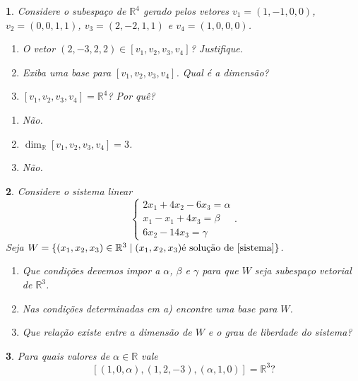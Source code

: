 \documentclass[12pt]{exam}
\newtheorem{exercicio}{}
\newcommand{\real}{\mathbb{R}}
\begin{document}
\begin{exercicio}
  Considere o subespa\c{c}o de $\real^4$ gerado pelos vetores $v_1 = (1, -1, 0, 0)$, $v_2 = (0, 0, 1, 1)$, $v_3 = (2, -2, 1, 1)$ e $v_4 = (1, 0, 0, 0)$.
  \begin{enumerate}[label={\alph*})]
    \item O vetor $(2, -3, 2, 2) \in [v_1, v_2, v_3, v_4]$? Justifique.
    \item Exiba uma base para $[v_1, v_2, v_3, v_4]$. Qual \'e a dimens\~ao?
    \item $[v_1, v_2, v_3, v_4] = \real^4$? Por qu\^e?
  \end{enumerate}
  \begin{solucao}
    \begin{enumerate}[label={\alph*})]
      \item N\~ao.
      \item $\dim_\real [v_1, v_2, v_3, v_4] = 3$.
      \item N\~ao.
    \end{enumerate}
  \end{solucao}
\end{exercicio}


\begin{exercicio}
  Considere o sistema linear
  \begin{equation}\label{sistema}
    \begin{cases}
      2x_1 + 4x_2 - 6x_3 = \alpha\\
      x_1 - x_1 + 4x_3 = \beta\\
      6x_2 - 14x_3 = \gamma
    \end{cases}.
  \end{equation}
  Seja $W = \{(x_1, x_2, x_3) \in \real^3 \mid (x_1, x_2, x_3) \mbox{\'e solu\c{c}\~ao de } \eqref{sistema}\}$.
  \begin{enumerate}[label={\alph*})]
    \item Que condi\c{c}\~oes devemos impor a $\alpha$, $\beta$ e $\gamma$ para que $W$ seja subespa\c{c}o vetorial de $\real^3$.
    \item Nas condi\c{c}\~oes determinadas em \textit{a)} encontre uma base para $W$.
    \item Que rela\c{c}\~ao existe entre a dimens\~ao de $W$ e o grau de liberdade do sistema?
  \end{enumerate}
\end{exercicio}

\begin{exercicio}
  Para quais valores de $\alpha \in \real$ vale
  \[
    [(1, 0, \alpha), (1, 2, -3) , (\alpha, 1, 0)] = \real^3?
  \]
\end{exercicio}
\end{document}
